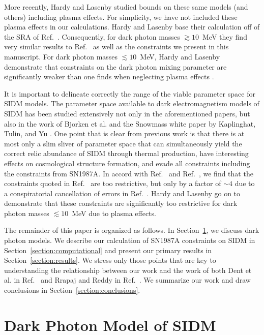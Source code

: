 \documentclass[nofootinbib,prd,superscriptaddress,twocolumn]{revtex4}
\begin{document}
More recently, Hardy and Lasenby \cite{hardy_lasenby17} studied bounds on these same models (and others) 
including plasma effects. For simplicity, we have not included these plasma effects in our calculations. Hardy 
and Lasenby base their calculation off of the SRA of Ref.~\cite{rrapaj_reddy16}. Consequently, 
for dark photon masses $\gtrsim 10$~MeV they find very similar results to Ref.~\cite{rrapaj_reddy16} as well 
as the constraints we present in this manuscript. For dark photon masses $\lesssim 10$~MeV, Hardy and 
Lasenby demonstrate that constraints on the dark photon mixing parameter are significantly weaker than 
one finds when neglecting plasma effects \cite{hardy_lasenby17}. 


It is important to delineate correctly the range of the viable parameter space for SIDM models. 
The parameter space available to dark electromagnetism models of SIDM has been studied extensively 
not only in the aforementioned papers, but also in the work of Bjorken et al. \cite{bjorken_etal09} and 
the Snowmass white paper by Kaplinghat, Tulin, and Yu \cite{kaplinghat_etal13_whitepaper}. One 
point that is clear from previous work is that there is at most only a slim sliver of parameter space that 
can simultaneously yield the correct relic abundance of SIDM through thermal production, 
have interesting effects on cosmological structure formation, and 
evade all constraints including the constraints from SN1987A. 
In accord with Ref.~\cite{rrapaj_reddy16} and Ref.~\cite{hardy_lasenby17}, we find that 
the constraints quoted in Ref.~\cite{dent_etal12} are too restrictive, but only by a factor 
of $\sim 4$ due to a conspiratorial cancellation of errors in Ref.~\cite{dent_etal12}. 
Hardy and Lasenby go on to demonstrate that these constraints are significantly too 
restrictive for dark photon masses $\lesssim 10$~MeV due to plasma effects.


The remainder of this paper is organized as follows. In Section~\ref{section:model}, we discuss 
dark photon models. We describe our calculation of SN1987A constraints on SIDM in 
Section~\ref{section:computational} and present our primary results in Section~\ref{section:results}. 
We stress only those points that are key to understanding the relationship between our work 
and the work of both Dent et al. in Ref.~\cite{dent_etal12} and Rrapaj and Reddy in Ref.~\cite{rrapaj_reddy16}. 
We summarize our work and draw conclusions in Section~\ref{section:conclusions}. 


\section{Dark Photon Model of SIDM}
\label{section:model}
\end{document}
